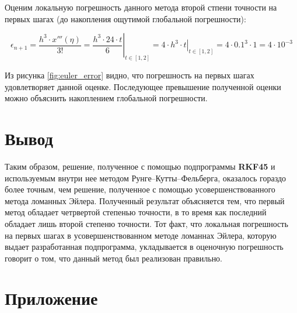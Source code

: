 Оценим локальную погрешность данного метода второй стпени точности на первых шагах (до накопления ощутимой глобальной погрешности):

\[
\epsilon_{n+1} = \frac{h^3 \cdot x'''(\eta)}{3!} = 
\left.\frac{h^3 \cdot 24\cdot t}{6} \right|_{t \in [1,2]} = 
\left.4\cdot h^3\cdot t \right|_{t \in [1,2]} = 
4\cdot 0.1^3\cdot 1 = 4\cdot 10^{-3}
\]

Из рисунка \ref{fig:euler_error} видно, что погрешность на первых шагах удовлетворяет данной оценке. Последующее превышение полученной оценки можно объяснить накоплением глобальной погрешности.

\section{Вывод}

Таким образом, решение, полученное с помощью подпрограммы \textbf{RKF45} и используемым внутри нее методом Рунге--Кутты--Фельберга, оказалось гораздо более точным, чем решение, полученное с помощью усовершенствованного метода ломанных Эйлера. Полученный результат объясняется тем, что первый метод обладает четрвертой степенью точности, в то время как последний обладает лишь второй степеню точности. Тот факт, что локальная погрешность на первых шагах в усовершенствованном методе ломаннах Эйлера, которую выдает разработанная подпрограмма, укладывается в оценочную погрешность говорит о том, что данный метод был реализован правильно.

\newpage

\section*{Приложение}










